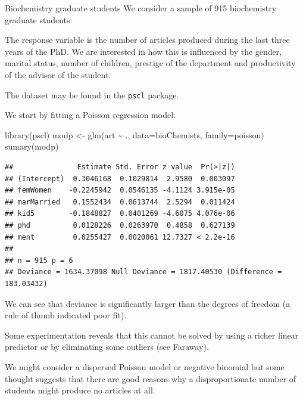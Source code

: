 \documentclass[
  ignorenonframetext,
]{beamer}
\newenvironment{Shaded}{\begin{snugshade}}{\end{snugshade}}
\newcommand{\AttributeTok}[1]{\textcolor[rgb]{0.77,0.63,0.00}{#1}}
\newcommand{\FunctionTok}[1]{\textcolor[rgb]{0.00,0.00,0.00}{#1}}
\newcommand{\NormalTok}[1]{#1}
\newcommand{\OtherTok}[1]{\textcolor[rgb]{0.56,0.35,0.01}{#1}}
\newcommand{\SpecialCharTok}[1]{\textcolor[rgb]{0.00,0.00,0.00}{#1}}
\begin{document}
\begin{frame}{Biochemistry graduate students}
\protect\hypertarget{biochemistry-graduate-students}{}
We consider a sample of 915 biochemistry graduate students.

\vspace{12pt}

The response variable is the number of articles produced during the last
three years of the PhD. \vspace{12pt} We are interested in how this is
influenced by the gender, marital status, number of children, prestige
of the department and productivity of the advisor of the student.

\vspace{12pt}

The dataset may be found in the \texttt{pscl} package.
\end{frame}

\begin{frame}[fragile]{}
\protect\hypertarget{section-28}{}
We start by fitting a Poisson regression model:

\vspace{12pt}
\tiny

\begin{Shaded}
\begin{Highlighting}[]
\FunctionTok{library}\NormalTok{(pscl)}
\NormalTok{modp }\OtherTok{\textless{}{-}} \FunctionTok{glm}\NormalTok{(art }\SpecialCharTok{\textasciitilde{}}\NormalTok{ ., }\AttributeTok{data=}\NormalTok{bioChemists, }\AttributeTok{family=}\NormalTok{poisson)}
\FunctionTok{sumary}\NormalTok{(modp)}
\end{Highlighting}
\end{Shaded}

\begin{verbatim}
##               Estimate Std. Error z value  Pr(>|z|)
## (Intercept)  0.3046168  0.1029814  2.9580  0.003097
## femWomen    -0.2245942  0.0546135 -4.1124 3.915e-05
## marMarried   0.1552434  0.0613744  2.5294  0.011424
## kid5        -0.1848827  0.0401269 -4.6075 4.076e-06
## phd          0.0128226  0.0263970  0.4858  0.627139
## ment         0.0255427  0.0020061 12.7327 < 2.2e-16
## 
## n = 915 p = 6
## Deviance = 1634.37098 Null Deviance = 1817.40530 (Difference = 183.03432)
\end{verbatim}
\end{frame}

\begin{frame}{}
\protect\hypertarget{section-29}{}
We can see that deviance is significantly larger than the degrees of
freedom (a rule of thumb indicated poor fit).

\vspace{12pt}

Some experimentation reveals that this cannot be solved by using a
richer linear predictor or by eliminating some outliers (see Faraway).

\vspace{12pt}

We might consider a dispersed Poisson model or negative binomial but
some thought suggests that there are good reasons why a disproportionate
number of students might produce no articles at all.
\end{frame}
\end{document}

